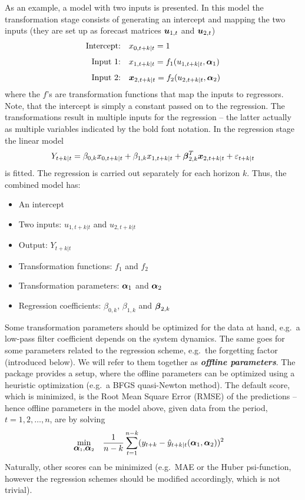 As an example, a model with two inputs is presented. In this model the
transformation stage consists of generating an intercept and mapping the two
inputs (they are set up as forecast matrices $\mbox{\boldmath{$u$}}_{1,t}$ and $\mbox{\boldmath{$u$}}_{2,t}$)
\begin{align}\label{eq:transformation-stage-example}
  \text{Intercept:}&\quad x_{0,t+k|t} = 1 \\[1ex]
  \text{Input 1:}&\quad x_{1,t+k|t} = f_1(u_{1,t+k|t}, \mbox{\boldmath{$\alpha$}}_{\mathrm{1}})\\[1ex]
  \text{Input 2:}&\quad \mbox{\boldmath{$x$}}_{2,t+k|t} = f_2(u_{2,t+k|t}, \mbox{\boldmath{$\alpha$}}_{\mathrm{2}})
\end{align}
where the $f$'s are transformation functions that map the inputs to
regressors. Note, that the intercept is simply a constant passed on to the
regression. The transformations result in multiple inputs for the regression --
the latter actually as multiple variables indicated by the bold font
notation. In the regression stage the linear model
\begin{align}\label{eq:regression-stage-example}
  Y_{t+k|t} = \beta_{0,k} x_{0,t+k|t} + \beta_{1,k}
  x_{1,t+k|t} + \mbox{\boldmath{$\beta$}}^T_{2,k} \mbox{\boldmath{$x$}}_{2,t+k|t} + \varepsilon_{t+k|t}
\end{align}
is fitted. The regression is carried out separately for each horizon $k$. Thus, the combined model has:
\begin{itemize}
\item An intercept
\item Two inputs: $u_{1,t+k|t}$ and $u_{2,t+k|t}$
\item Output: $Y_{t+k|t}$
\item Transformation functions: $f_1$ and $f_2$
\item Transformation parameters: $\mbox{\boldmath{$\alpha$}}_{\mathrm{1}}$ and $\mbox{\boldmath{$\alpha$}}_{\mathrm{2}}$
\item Regression coefficients: $\beta_{0,k}$, $\beta_{1,k}$ and
  $\mbox{\boldmath{$\beta$}}_{2,k}$
\end{itemize}

Some transformation parameters should be optimized for the data at hand, e.g.\ a
low-pass filter coefficient depends on the system dynamics. The same goes for
some parameters related to the regression scheme, e.g.\ the forgetting factor
(introduced below). We will refer to them together as {\bf\emph{offline parameters}}.
The \onlineforecast package provides a setup, where the offline parameters
can be optimized using a heuristic optimization (e.g.\ a BFGS quasi-Newton
method). The default score, which is minimized, is the Root Mean Square Error
(RMSE) of the predictions -- hence offline parameters in the
model above, given data from the period, $t = 1,2,\dots,n$, are  by
solving
\begin{align}\label{eq:rmse-score}
  \min_{\mbox{\boldmath{$\alpha$}}_{\mathrm{1}}, \mbox{\boldmath{$\alpha$}}_{\mathrm{2}}} \quad & \frac{1}{n-k}\sum_{t=1}^{n-k} (y_{t+k} -
  \hat{y}_{t+k|t}(\mbox{\boldmath{$\alpha$}}_{\mathrm{1}}, \mbox{\boldmath{$\alpha$}}_{\mathrm{2}}))^2
\end{align}
Naturally, other scores can be minimized (e.g.\ MAE or the Huber psi-function,
however the regression schemes should be modified accordingly, which is not
trivial).

